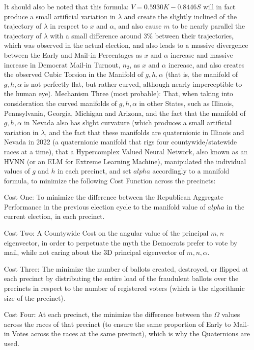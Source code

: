 \documentclass[preprint,13pt]{elsarticle}
\begin{document}
It should also be noted that this formula: $V=0.5930K-0.8446S$ will in fact produce a small artificial variation in $\lambda$ and create the slightly inclined of the trajectory of $\lambda$ in respect to $x$ and $\alpha$, and also cause $m$ to be nearly parallel the trajectory of $\lambda$ with a small difference around 3\% between their trajectories, which was observed in the actual election, and also leads to a massive divergence between the Early and Mail-in Percentages as $x$ and $\alpha$ increase and massive increase in Democrat Mail-in Turnout, $n_{2}$, as $x$ and $\alpha$ increase, and also creates the observed Cubic Torsion in the Manifold of $g,h,\alpha$ (that is, the manifold of $g,h,\alpha$ is not perfectly flat, but rather curved, although nearly imperceptible to the human eye).
\newpage
Mechanism Three (most probable): That, when taking into consideration the curved manifolds of $g,h,\alpha$ in other States, such as Illinois, Pennsylvania, Georgia, Michigan and Arizona, and the fact that the manifold of $g,h,\alpha$ in Nevada also has slight curvature (which produces a small artificial variation in $\lambda$, and the fact that these manifolds are quaternionic in Illinois and Nevada in 2022 (a quaternionic manifold that rigs four countywide/statewide races at a time), that a Hypercomplex Valued Neural Network, also known as an HVNN (or an ELM for Extreme Learning Machine), manipulated the individual values of $g$ and $h$ in each precinct, and set $alpha$ accordingly to a manifold formula, to minimize the following Cost Function across the precincts:

Cost One: To minimize the difference between the Republican Aggregate Performance in the previous election cycle to the manifold value of $alpha$ in the current election, in each precinct.

Cost Two: A Countywide Cost on the angular value of the principal $m,n$ eigenvector, in order to perpetuate the myth the Democrats prefer to vote by mail, while not caring about the 3D principal eigenvector of $m,n,\alpha$.

Cost Three: The minimize the number of ballots created, destroyed, or flipped at each precinct by distributing the entire load of the fraudulent ballots over the precincts in respect to the number of registered voters (which is the algorithmic size of the precinct).

Cost Four: At each precinct, the minimize the difference between the $\Omega$ values across the races of that precinct (to ensure the same proportion of Early to Mail-in Votes across the races at the same precinct), which is why the Quaternions are used.
\end{document}
